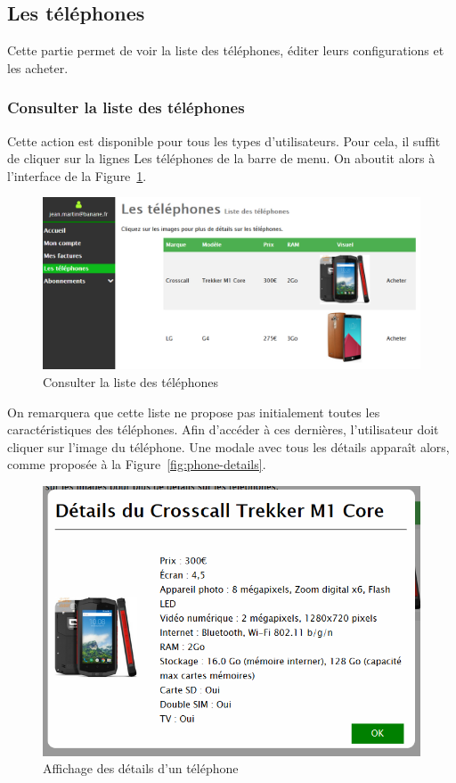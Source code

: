 \subsection{Les téléphones}
Cette partie permet de voir la liste des téléphones, éditer leurs configurations et les acheter.

\subsubsection{Consulter la liste des téléphones}
Cette action est disponible pour tous les types d'utilisateurs. Pour cela, il suffit de cliquer sur la lignes \og Les téléphones\fg{} de la barre de menu. On aboutit alors à l'interface de la Figure~\ref{fig:phones-list}.

\begin{figure}[ht]
  \centering
  \includegraphics[width=.7\textwidth]{images/Plateforme/phone-list}
  \caption{Consulter la liste des téléphones}
  \label{fig:phones-list}
\end{figure}

On remarquera que cette liste ne propose pas initialement toutes les caractéristiques des téléphones. Afin d'accéder à ces dernières, l'utilisateur doit cliquer sur l'image du téléphone. Une modale avec tous les détails apparaît alors, comme proposée à la Figure~\ref{fig:phone-details}.

\begin{figure}[ht]
  \centering
  \includegraphics[width=.7\textwidth]{images/Plateforme/phone-details}
  \caption{Affichage des détails d'un téléphone}
  \label{fig:phones-details}
\end{figure}

